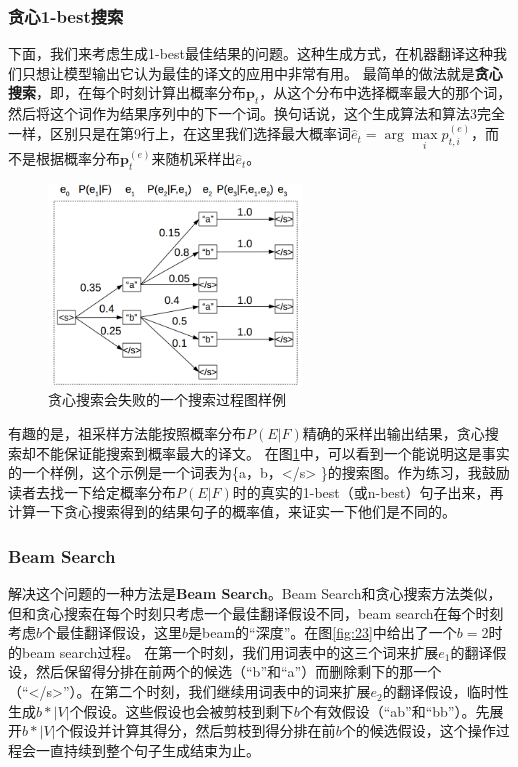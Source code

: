 \documentclass[10pt,a4paper]{ctexart}
\begin{document}
\subsubsection{贪心1-best搜索}
下面，我们来考虑生成1-best最佳结果的问题。这种生成方式，在机器翻译这种我们只想让模型输出它认为最佳的译文的应用中非常有用。
最简单的做法就是\textbf{贪心搜索}，即，在每个时刻计算出概率分布$\textbf{p}_t$，从这个分布中选择概率最大的那个词，然后将这个词作为结果序列中的下一个词。换句话说，这个生成算法和算法3完全一样，区别只是在第9行上，在这里我们选择最大概率词$\hat{e}_t = \arg \max \limits_{i} p_{t,i}^{(e)}$，而不是根据概率分布$\textbf{p}_t^{(e)}$来随机采样出$\hat{e}_t$。

\begin{figure}[H]
\centering
\includegraphics[width=0.6\textwidth]{fig22.png}
\caption{贪心搜索会失败的一个搜索过程图样例}
\label{fig:22}
\end{figure}

有趣的是，祖采样方法能按照概率分布$P(E|F)$精确的采样出输出结果，贪心搜索却不能保证能搜索到概率最大的译文。
在图\ref{fig:22}中，可以看到一个能说明这是事实的一个样例，这个示例是一个词表为\{a，b，</s> \}的搜索图。作为练习，我鼓励读者去找一下给定概率分布$P(E|F)$时的真实的1-best（或n-best）句子出来，再计算一下贪心搜索得到的结果句子的概率值，来证实一下他们是不同的。

\subsubsection{Beam Search}
解决这个问题的一种方法是\textbf{Beam Search}。Beam Search和贪心搜索方法类似，但和贪心搜索在每个时刻只考虑一个最佳翻译假设不同，beam search在每个时刻考虑$b$个最佳翻译假设，这里$b$是beam的“深度”。在图\ref{fig:23}中给出了一个$b=2$时的beam search过程。
在第一个时刻，我们用词表中的这三个词来扩展$e_1$的翻译假设，然后保留得分排在前两个的候选（“b”和“a”）而删除剩下的那一个（“</s>”）。在第二个时刻，我们继续用词表中的词来扩展$e_2$的翻译假设，临时性生成$b * |V|$个假设。这些假设也会被剪枝到剩下$b$个有效假设（“ab”和“bb”）。先展开$b * |V|$个假设并计算其得分，然后剪枝到得分排在前$b$个的候选假设，这个操作过程会一直持续到整个句子生成结束为止。
\end{document}

